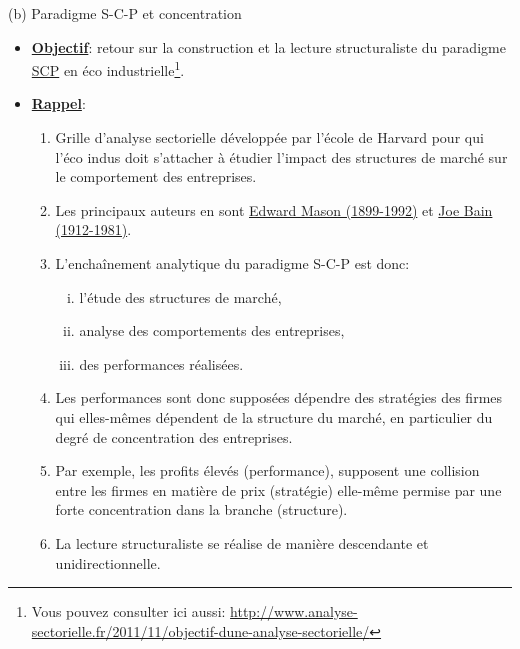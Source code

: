 \begin{frame}[allowframebreaks]{(b) Paradigme S-C-P et concentration}
\begin{itemize}
   \item \underline{\textbf{Objectif}}: retour sur la construction et la 
   lecture structuraliste du paradigme 
   \href{https://fr.wikipedia.org/wiki/Structure\_comportement\_performance}{SCP} en 
   éco industrielle\footnote{Vous pouvez consulter ici aussi: 
   \url{http://www.analyse-sectorielle.fr/2011/11/objectif-dune-analyse-sectorielle/}}. 
   \item \textbf{\underline{Rappel}}: 
   \begin{enumerate}[-]
    \item Grille d’analyse sectorielle développée par l’école de Harvard pour qui 
    l’éco indus doit s’attacher à étudier l’impact des structures de marché sur 
    le comportement des entreprises. 
    \item Les principaux auteurs en sont 
    \href{https://fr.wikipedia.org/wiki/Edward\_Mason}{Edward Mason (1899-1992)}
    et \href{https://fr.wikipedia.org/wiki/Joe\_Bain}{Joe Bain (1912-1981)}. 

    \framebreak

    \item L’enchaînement analytique du paradigme S-C-P est donc: 
    \begin{enumerate}[(i)]
    \item l’étude des structures de marché, 
    \item analyse des comportements des entreprises, 
    \item des performances réalisées. 
    \end{enumerate}
    \item Les performances sont donc supposées dépendre des stratégies des firmes 
    qui elles-mêmes dépendent de la structure du marché, 
    en particulier du degré de concentration des entreprises. 
    \item Par exemple, les profits élevés (performance), supposent 
    une collision entre les firmes en matière de prix (stratégie) elle-même permise 
    par une forte concentration dans la branche (structure). 

    \framebreak 

    \item La lecture structuraliste se réalise de manière descendante et unidirectionnelle. 
    \vspace{0.5cm}


\end{enumerate}
\end{itemize}
\end{frame}
